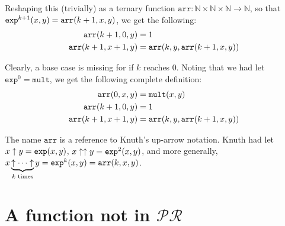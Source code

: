 Reshaping this (trivially) as a ternary function $\mathtt{arr} : \mathbb{N}
\times \mathbb{N} \times \mathbb{N} \rightarrow \mathbb{N}$, so that
$\mathtt{exp}^{k+1}{\mathopen{}\left({x,y}\right)\mathclose{}} = \mathtt{arr}{\mathopen{}\left({k+1,x,y}\right)\mathclose{}}$, we get the
following:\begin{align*}
%
\mathtt{arr}\p{k+1, 0,y} &= 1 \\
%
\mathtt{arr}\p{k+1,x+1,y} &= \mathtt{arr}\p{k,y,\mathtt{arr}\p{k+1,x,y}}
%
\end{align*}

Clearly, a base case is missing for if $k$ reaches $0$.  Noting that we had let
$\mathtt{exp}^0 = \mathtt{mult}$, we get the following complete
definition:\begin{align*}
%
\mathtt{arr}\p{0,x,y} &= \mathtt{mult}\p{x,y} \\
%
\mathtt{arr}\p{k+1, 0,y} &= 1 \\
%
\mathtt{arr}\p{k+1,x+1,y} &= \mathtt{arr}\p{k,y,\mathtt{arr}\p{k+1,x,y}}
%
\end{align*}

\begin{remark} The name $\mathtt{arr}$ is a reference to Knuth's up-arrow
notation\cite{knuth-1976}. Knuth had let $x \uparrow y = \mathtt{exp}{\mathopen{}\left({x,y}\right)\mathclose{}}$,
$x \uparrow \uparrow y = \mathtt{exp}^2{\mathopen{}\left({x,y}\right)\mathclose{}}$, and more generally, $x
\underbrace{\uparrow \cdots \uparrow}_{\text{$k$ times}} y =
\mathtt{exp}^k{\mathopen{}\left({x,y}\right)\mathclose{}} = \mathtt{arr}{\mathopen{}\left({k,x,y}\right)\mathclose{}}$. \end{remark}

\section{A function not in $\mathcal{PR}$}





